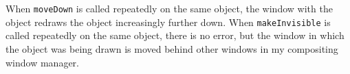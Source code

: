 When \verb|moveDown| is called repeatedly on the same object, the window
with the object redraws the object increasingly further down. When
\verb|makeInvisible| is called repeatedly on the same object, there
is no error, but the window in which the object was being drawn is moved
behind other windows in my compositing window manager.
